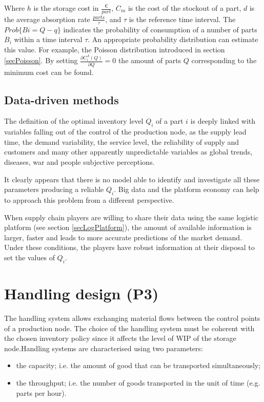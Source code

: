 Where $h$ is the storage cost in $\frac{\euro{} }{part}$, $C_m$ is the cost of the stockout of a part, $d$ is the average absorption rate $\frac{parts}{\tau}$, and $\tau$ is the reference time interval. The $Prob\{Bi=Q-q\}$ indicates the probability of consumption of a number of parts $B_i$ within a time interval $\tau$. An appropriate probability distribution can estimate this value. For example, the Poisson distribution introduced in section \ref{secPoisson}. By setting $\frac{\partial C_i^\Lambda\left(Q\right)}{\partial Q}=0$ the amount of parts $Q$ corresponding to the minimum cost can be found.

\subsection{Data-driven methods}
The definition of the optimal inventory level $Q_i$ of a part $i$ is deeply linked with variables falling out of the control of the production node, as the supply lead time, the demand variability, the service level, the reliability of supply and customers and many other apparently unpredictable variables as global trends, diseases, war and people subjective perceptions. \par

It clearly appears that there is no model able to identify and investigate all these parameters producing a reliable $Q_i$. Big data and the platform economy can help to approach this problem from a different perspective.\par

When supply chain players are willing to share their data using the same logistic platform (see section \ref{secLogPlatform}), the amount of available information is larger, faster and leads to more accurate predictions of the market demand. Under these conditions, the players have robust information at their disposal to set the values of $Q_i$. 

\section{Handling design (P3)}

The handling system allows exchanging material flows between the control points of a production node. The choice of the handling system must be coherent with the chosen inventory policy since it affects the level of WIP of the storage node.Handling systems are characterised using two parameters:

\begin{itemize}
    \item the capacity; i.e. the amount of good that can be transported simultaneously;
    \item the throughput; i.e. the number of goods transported in the unit of time (e.g. parts per hour).
\end{itemize}

